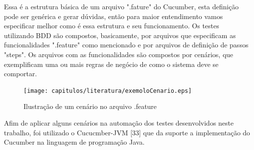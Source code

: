 Essa é a estrutura básica de um arquivo ".fature" do Cucumber, esta definição pode ser genérica e gerar dúvidas, então para maior entendimento vamos especificar melhor como é essa estrutura e seu funcionamento. Os testes utilizando BDD são compostos, basicamente, por arquivos que especificam as funcionalidades ".feature" como mencionado e por arquivos de definição de passos "steps". Os arquivos com as funcionalidades são compostos por cenários, que exemplificam uma ou mais regras de negócio de como o sistema deve se comportar.

\begin{figure}[H]
	\centering
	\captionsetup{justification=centering,margin=2cm}
	\texttt{[image: capitulos/literatura/exemoloCenario.eps]}
	\caption{Ilustração de um cenário no arquivo .feature}
	\label{fig:iceCreamConAntiPattern}
\end{figure}	

Afim de aplicar alguns cenários na automação dos testes desenvolvidos neste trabalho, foi utilizado o Cucucmber-JVM [33] que da suporte a implementação do Cucumber na linguagem de programação Java.
